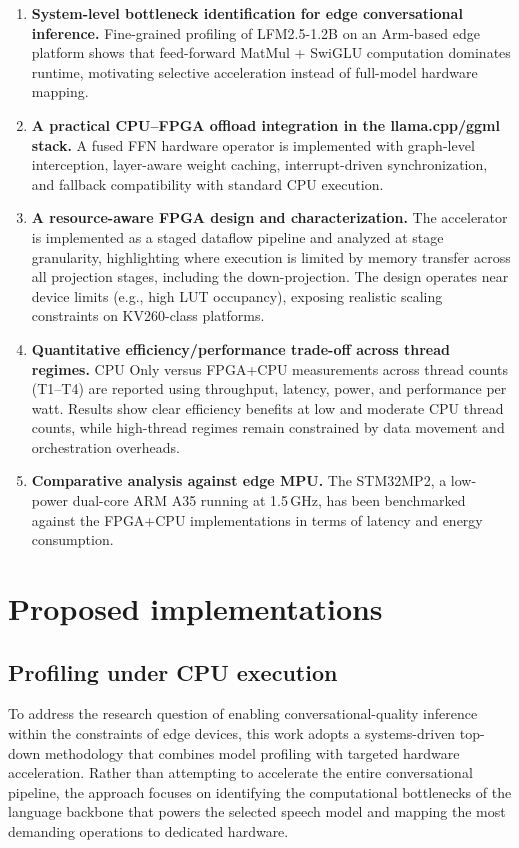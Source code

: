 \documentclass[manuscript,]{acmart} %
\begin{document}
\begin{enumerate}
    \item \textbf{System-level bottleneck identification for edge conversational inference.}
    Fine-grained profiling of LFM2.5-1.2B on an Arm-based edge platform shows that feed-forward MatMul + SwiGLU computation dominates runtime, motivating selective acceleration instead of full-model hardware mapping.

    \item \textbf{A practical CPU--FPGA offload integration in the llama.cpp/ggml stack.}
    A fused FFN hardware operator is implemented with graph-level interception, layer-aware weight caching, interrupt-driven synchronization, and fallback compatibility with standard CPU execution.

    \item \textbf{A resource-aware FPGA design and characterization.}
    The accelerator is implemented as a staged dataflow pipeline and analyzed at stage granularity, highlighting where execution is limited by memory transfer across all projection stages, including the down-projection. The design operates near device limits (e.g., high LUT occupancy), exposing realistic scaling constraints on KV260-class platforms.

    \item \textbf{Quantitative efficiency/performance trade-off across thread regimes.}
    CPU Only versus FPGA+CPU measurements across thread counts (T1--T4) are reported using throughput, latency, power, and performance per watt. Results show clear efficiency benefits at low and moderate CPU thread counts, while high-thread regimes remain constrained by data movement and orchestration overheads.

    \item \textbf{Comparative analysis against edge MPU.}
    The STM32MP2, a low-power dual-core ARM A35 running at 1.5\,GHz, has been benchmarked against the FPGA+CPU implementations in terms of latency and energy consumption.
\end{enumerate}

\section{Proposed implementations} \label{sec:approach}
\subsection{Profiling under CPU execution} \label{subsec:cpuexec}
To address the research question of enabling conversational-quality inference within the constraints of edge devices, this work adopts a systems-driven top-down methodology that combines model profiling with targeted hardware acceleration. Rather than attempting to accelerate the entire conversational pipeline, the approach focuses on identifying the computational bottlenecks of the language backbone that powers the selected speech model and mapping the most demanding operations to dedicated hardware.
\end{document}
